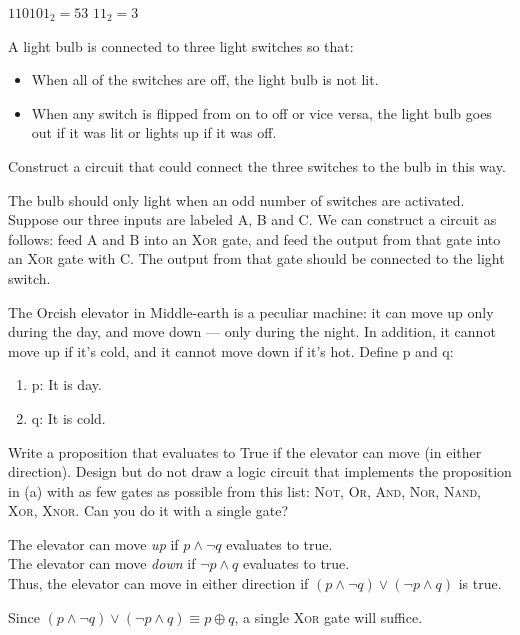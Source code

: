\documentclass[solution, letterpaper]{cs20}
\begin{document}
        \begin{solution}
            \subsolution $110101_2 = 53$
            \subsolution $11_2 = 3$
        \end{solution}

        A light bulb is connected to three light switches so that:
          \begin{itemize}
            \item When all of the switches are off, the light bulb is not lit.
            \item When any switch is flipped from on to off or vice versa, the light bulb goes out if it was lit or lights up if it was off.
          \end{itemize}
        Construct a circuit that could connect the three switches to the bulb in this way.

        \begin{solution}

        The bulb should only light when an odd number of switches are activated. Suppose our three inputs are labeled A, B and C. We can construct a circuit as follows: feed A and B into an \textsc{Xor} gate, and feed the output from that gate into an \textsc{Xor} gate with C. The output from that gate should be connected to the light switch.
        \end{solution}

        The Orcish elevator in Middle-earth is a peculiar machine: it can move up only during the day, and move down --- only during the night. In addition, it cannot move up if it's cold, and it cannot move down if it's hot. Define p and q:

        \begin{enumerate}
            \item p: It is day.
            \item q: It is cold.
        \end{enumerate}

        \subproblem Write a proposition that evaluates to True if the elevator can move (in either direction).
        \subproblem Design but do not draw a logic circuit that implements the proposition in (a) with as few gates as possible from this list: \textsc{Not}, \textsc{Or}, \textsc{And}, \textsc{Nor}, \textsc{Nand}, \textsc{Xor}, \textsc{Xnor}. Can you do it with a single gate?

        \begin{solution}
        \subsolution
            The elevator can move \emph{up} if $p \land \lnot q$ evaluates to true. \\
            The elevator can move \emph{down} if $\lnot p \land q$ evaluates to true. \\
            Thus, the elevator can move in either direction if $(p \land \lnot q) \lor (\lnot p \land q)$ is true.

        \subsolution Since $(p \land \lnot q) \lor (\lnot p \land q) \equiv p \oplus q$, a single \textsc{Xor} gate will suffice.

        \end{solution}
\end{document}
